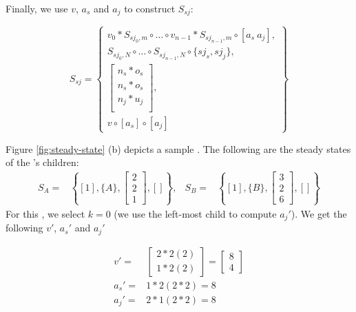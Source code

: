 Finally, we use $v$, $a_s$ and $a_j$ to construct $S_{sj}$:

\begin{displaymath}
S_{sj} = \left\{
\begin{array}{c}
v_0 * S_{sj_0,m} \circ \dots \circ v_{n-1} * S_{sj_{n-1}, m} \circ
[a_s\ a_j] , \\
S_{sj_0, N} \circ \dots \circ S_{sj_{n-1}, N} \circ \{sj_s,
sj_j\},
\\ \left[
\begin{array}{c}
n_s * o_{s} \\
n_s * o_{s} \\
n_j * u_{j} \\
\end{array}\right], \\
v \circ [a_s] \circ [a_j]
\end{array}\right\}
\end{displaymath}

Figure \ref{fig:steady-state} (b) depicts a sample {\splitjoin}.
The following are the steady states of the {\splitjoin}'s
children: $$
\begin{array}{lrlr} S_A = & \left\{[1], \{A\}, { \left[
\begin{array}{c} 2 \\ 2 \\ 1
\end{array}
\right]}, [] \right\}, & S_B = & \left\{[1], \{B\}, { \left[
\begin{array}{c} 3 \\ 2 \\ 6
\end{array}
\right]}, [] \right\}
\end{array}
$$ For this {\splitjoin}, we select $k = 0$ (we use the left-most child
to compute $a_j'$).  We get the following $v'$, $a_s'$ and $a_j'$

\begin{displaymath}
\begin{array}{rl}
v' = & \left[
\begin{array}{c}
2 * 2 (2)\\
1 * 2 (2)
\end{array}
\right] = \left[
\begin{array}{c}
8 \\ 4
\end{array}
\right] \\
a_s' = & 1 * 2 (2 * 2) = 8 \\
a_j' = & 2 * 1 (2 * 2) = 8
\end{array}
\end{displaymath}

